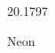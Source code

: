 \documentclass[12pt]{article}
\begin{document}
\hfill{}
\vfill
\begin{center}
  {\fontsize{50}{60}
  }

  \vspace{1em}

  20.1797

Neon
\end{center}
\vfill
\end{document}
